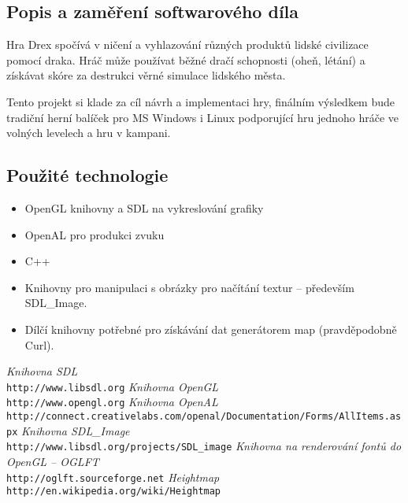 \documentclass{article}
\begin{document}
\subsection{Popis a zaměření softwarového díla}

Hra Drex spočívá v ničení a vyhlazování různých produktů lidské civilizace pomocí draka. Hráč může používat běžné dračí schopnosti (oheň, létání) a získávat skóre za destrukci věrné simulace lidského města.

Tento projekt si klade za cíl návrh a implementaci hry, finálním výsledkem bude tradiční herní balíček pro MS Windows i Linux podporující hru jednoho hráče ve volných levelech a hru v kampani.

\subsection{Použité technologie}

\begin{itemize}
\item OpenGL knihovny a SDL na vykreslování grafiky
\item OpenAL pro produkci zvuku
\item C++
\item Knihovny pro manipulaci s obrázky pro načítání textur -- především SDL\_Image.
\item Dílčí knihovny potřebné pro získávání dat generátorem map (pravděpodobně Curl).
\end{itemize}

\renewcommand\refname{\subsection{Odkazy (Reference)}}

\begin{thebibliography}{9}
	\emph{Knihovna SDL} \\
	\texttt{http://www.libsdl.org}
	\emph{Knihovna OpenGL} \\
	\texttt{http://www.opengl.org}
	\emph{Knihovna OpenAL} \\
	\texttt{http://connect.creativelabs.com/openal/Documentation/Forms/AllItems.aspx}
	\emph{Knihovna SDL\_Image} \\
	\texttt{http://www.libsdl.org/projects/SDL\_image} 
	\emph{Knihovna na renderování fontů do OpenGL -- OGLFT} \\
	\texttt{http://oglft.sourceforge.net}
	\emph{Heightmap} \\
	\texttt{http://en.wikipedia.org/wiki/Heightmap}
\end{thebibliography}
\end{document}
